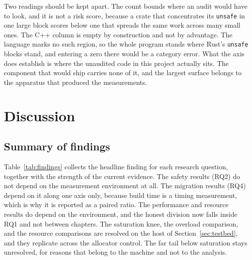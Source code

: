 \documentclass[english,oneside,a4paper,censored,csm,software-track-2020]{HYthesisML}
\begin{document}
Two readings should be kept apart. The count bounds where an audit would have to look, and it is
not a risk score, because a crate that concentrates its \texttt{unsafe} in one large block scores
below one that spreads the same work across many small ones. The C++ column is empty by
construction and not by advantage. The language marks no such region, so the whole program stands
where Rust's
\texttt{unsafe} blocks stand, and entering a zero there would be a category error. What the axis
does establish is where the unaudited code in this project actually sits. The component that would
ship carries none of it, and the largest surface belongs to the apparatus that produced the
measurements.

\chapter{Discussion\label{chapter:discussion}}

\section{Summary of findings}
Table~\ref{tab:findings} collects the headline finding for each research question, together with the
strength of the current evidence. The safety results (RQ2) do not depend on the measurement
environment at all. The migration results (RQ4) depend on it along one axis only, because build
time is a timing measurement, which is why it is reported as a paired ratio. The performance and
resource results do depend on the environment, and the honest division now falls inside RQ1 and not
between chapters. The saturation knee, the overload comparison, and the
resource comparisons are resolved on the host of Section~\ref{sec:testbed}, and they replicate
across the allocator control. The far tail below saturation stays unresolved, for reasons that
belong to the machine and not to the analysis.
\end{document}

